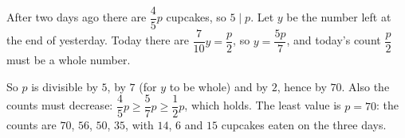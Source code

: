 After two days ago there are $\dfrac{4}{5}p$ cupcakes, so $5\mid p$. Let $y$ be the number left at the end of yesterday. Today there are $\dfrac{7}{10}y=\dfrac {p}{2}$, so $y=\dfrac{5p}{7}$, and today's count $\dfrac {p}{2}$ must be a whole number.

So $p$ is divisible by $5$, by $7$ (for $y$ to be whole) and by $2$, hence by $70$. Also the counts must decrease: $\dfrac{4}{5}p\ge\dfrac{5}{7}p\ge\dfrac{1}{2}p$, which holds. The least value is $p=\boxed{70}$: the counts are $70$, $56$, $50$, $35$, with $14$, $6$ and $15$ cupcakes eaten on the three days.
